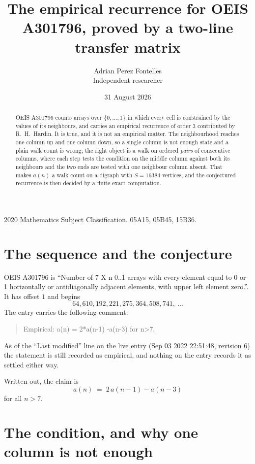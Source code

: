 \documentclass[11pt,a4paper]{article}
\title{The empirical recurrence for OEIS A301796, proved by a two-line transfer matrix}
\author{Adrian Perez Fontelles\\ \small Independent researcher}
\date{31 August 2026}
\theoremstyle{plain}
\theoremstyle{definition}
\begin{document}
\maketitle

\begin{abstract}
OEIS A301796 counts arrays over $\{0,\dots,1\}$ in which every cell is constrained by the
values of its neighbours, and carries an empirical recurrence of order $3$ contributed
by R.~H.~Hardin. It is true, and it is not an empirical matter. The neighbourhood reaches one
column up and one column down, so a single column is not enough state and a plain walk count
is wrong; the right object is a walk on ordered \emph{pairs} of consecutive columns, where
each step tests the condition on the middle column against both its neighbours and the two
ends are tested with one neighbour column absent. That makes $a(n)$ a walk count on a digraph
with $S=16384$ vertices, and the conjectured recurrence is then decided by a finite exact
computation.
\end{abstract}

\noindent\small 2020 Mathematics Subject Classification. 05A15, 05B45, 15B36.\normalsize

\section{The sequence and the conjecture}

OEIS A301796 is ``Number of 7 X n 0..1 arrays with every element equal to 0 or 1 horizontally or antidiagonally adjacent elements, with upper left element zero.''. It has offset $1$ and begins
\[
64, 610, 192, 221, 275, 364, 508, 741,\ \dots
\]
The entry carries the following comment:
\begin{quote}\small
Empirical: a(n) = 2*a(n-1) -a(n-3) for n>7.
\end{quote}
As of the ``Last modified'' line on the live entry (Sep 03 2022 22:51:48, revision 6) the statement is
still recorded as empirical, and nothing on the entry records it as settled either way.

Written out, the claim is
\begin{equation}\label{eq:conj}
a(n)\;=\;2\,a(n-1) - a(n-3)
\end{equation}
for all $n>7$.

\section{The condition, and why one column is not enough}
\end{document}
